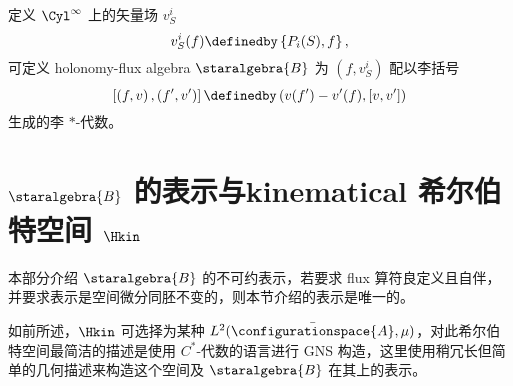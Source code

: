 		定义 $\Cyl^\infty$ 上的矢量场 $v_S^i$
		\begin{equation}
			v_S^i(f) \definedby \left\{ P_i(S), f \right\},
		\end{equation}
		可定义 holonomy-flux algebra $\staralgebra{B}$ 为 $(f,v_S^i)$ 配以李括号
		\begin{equation*}
			\left[ \left( f, v \right), \left( f', v' \right) \right] \definedby \left( v(f') - v'(f), \left[ v, v' \right] \right)
		\end{equation*}
		生成的李 $*$-代数。

		\section{\texorpdfstring{$\staralgebra{B}$ 的表示与kinematical 希尔伯特空间 $\Hkin$}{B 的表示与 kinematical 希尔伯特空间}}

		本部分介绍 $\staralgebra{B}$ 的不可约表示，若要求 flux 算符良定义且自伴，并要求表示是空间微分同胚不变的，则本节介绍的表示是唯一的。\cite{Thiemann2007}
	
		如前所述，$\Hkin$ 可选择为某种 $L^2(\bar{\configurationspace{A}},\mu)$，对此希尔伯特空间最简洁的描述是使用 $C^*$-代数的语言进行 GNS 构造\cite{Thiemann2007,Han2005}，这里使用稍冗长但简单的几何描述来构造这个空间及 $\staralgebra{B}$ 在其上的表示。
	
	
